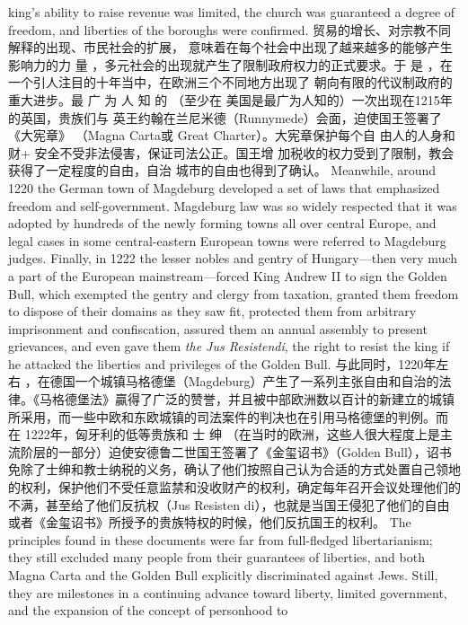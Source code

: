 \begin{paracol}{2}
king's ability to raise revenue was limited, the church was guaranteed a degree of freedom, and liberties of the boroughs were
confirmed.
\switchcolumn
贸易的增长、对宗教不同解释的出现、市民社会的扩展，
意味着在每个社会中出现了越来越多的能够产生影响力的力
量 ，多元社会的出现就产生了限制政府权力的正式要求。于
是 ，在一个引人注目的十年当中，在欧洲三个不同地方出现了
朝向有限的代议制政府的重大进步。最 广 为 人 知 的 （至少在
美国是最广为人知的）一次出现在1215年的英国，贵族们与
英王约翰在兰尼米德（Runnymede）会面，迫使国王签署了
《大宪章》 （Magna Carta或 Great Charter）。大宪章保护每个自
由人的人身和财+ 安全不受非法侵害，保证司法公正。国王增
加税收的权力受到了限制，教会获得了一定程度的自由，自治
城市的自由也得到了确认。
\switchcolumn*
Meanwhile, around 1220 the German town of Magdeburg
developed a set of laws that emphasized freedom and self-government. Magdeburg law was so widely respected that it was
adopted by hundreds of the newly forming towns all over central Europe, and legal cases in some central-eastern European
towns were referred to Magdeburg judges. Finally, in 1222 the lesser nobles and gentry of Hungary---then very much a part of the European mainstream---forced King Andrew II to sign the Golden Bull, which exempted the gentry and clergy from
taxation, granted them freedom to dispose of their domains as
they saw fit, protected them from arbitrary imprisonment and
confiscation, assured them an annual assembly to present
grievances, and even gave them \textit{the Jus Resistendi}, the right to
resist the king if he attacked the liberties and privileges of the
Golden Bull.
\switchcolumn
与此同时，1220年左右 ，在德国一个城镇马格德堡（Magdeburg）产生了一系列主张自由和自治的法律。《马格德堡法》贏得了广泛的赞誉，并且被中部欧洲数以百计的新建立的城镇所采用，而一些中欧和东欧城镇的司法案件的判决也在引用马格德堡的判例。而 在 1222年，匈牙利的低等贵族和
士 绅 （在当时的欧洲，这些人很大程度上是主流阶层的一部分）迫使安德鲁二世国王签署了《金玺诏书》（Golden Bull），诏书免除了士绅和教士纳税的义务，确认了他们按照自己认为合适的方式处置自己领地的权利，保护他们不受任意监禁和没收财产的权利，确定每年召开会议处理他们的不满，甚至给了他们反抗权（Jus Resisten di），也就是当国王侵犯了他们的自由或者《金玺诏书》所授予的贵族特权的时候，他们反抗国王的权利。
\switchcolumn*
The principles found in these documents were far from full-fledged libertarianism; they still excluded many people from
their guarantees of liberties, and both Magna Carta and the
Golden Bull explicitly discriminated against Jews. Still, they
are milestones in a continuing advance toward liberty, limited
government, and the expansion of the concept of personhood to

\end{paracol}
